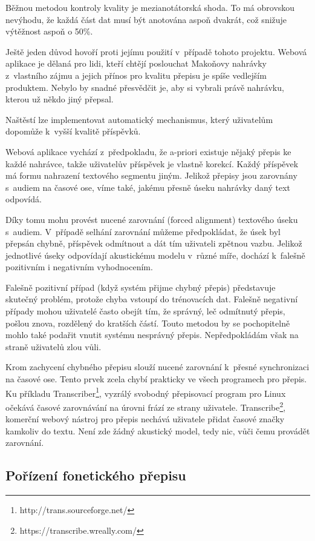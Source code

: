 Běžnou metodou kontroly kvality je mezianotátorská shoda. To má obrovskou
nevýhodu, že každá část dat musí být anotována aspoň dvakrát, což snižuje
výtěžnost aspoň o 50\%.

Ještě jeden důvod hovoří proti jejímu použití v~případě tohoto projektu. Webová
aplikace je dělaná pro lidi, kteří chtějí poslouchat Makoňovy nahrávky
z~vlastního zájmu a jejich přínos pro kvalitu přepisu je spíše vedlejším
produktem. Nebylo by snadné přesvědčit je, aby si vybrali právě nahrávku, kterou
už někdo jiný přepsal.

Naštěstí lze implementovat automatický mechanismus, který uživatelům dopomůže
k~vyšší kvalitě příspěvků.

Webová aplikace vychází z~předpokladu, že a-priori existuje nějaký přepis ke
každé nahrávce, takže uživatelův příspěvek je vlastně korekcí. Každý příspěvek
má formu nahrazení textového segmentu jiným. Jelikož přepisy jsou zarovnány
s~audiem na časové ose, víme také, jakému přesně úseku nahrávky daný text
odpovídá.

Díky tomu mohu provést nucené zarovnání (forced alignment) textového úseku
s~audiem. V~případě selhání zarovnání můžeme předpokládat, že úsek byl přepsán
chybně, příspěvek odmítnout a dát tím uživateli zpětnou vazbu. Jelikož
jednotlivé úseky odpovídají akustickému modelu v~různé míře, dochází k~falešně
pozitivním i negativním vyhodnocením.

Falešně pozitivní případ (když systém přijme chybný přepis) představuje skutečný
problém, protože chyba vstoupí do trénovacích dat. Falešně negativní případy
mohou uživatelé často obejít tím, že správný, leč odmítnutý přepis, pošlou
znova, rozdělený do kratších částí. Touto metodou by se pochopitelně mohlo také
podařit vnutit systému nesprávný přepis. Nepředpokládám však na straně uživatelů
zlou vůli.

Krom zachycení chybného přepisu slouží nucené zarovnání k~přesné synchronizaci
na časové ose. Tento prvek zcela chybí prakticky ve všech programech pro přepis.
Ku příkladu Transcriber\footnote{http://trans.sourceforge.net/}, vyzrálý
svobodný přepisovací program pro Linux očekává časové zarovnávání na úrovni
frází ze strany uživatele. Transcribe\footnote{https://transcribe.wreally.com/},
komerční webový nástroj pro přepis nechává uživatele přidat časové značky
kamkoliv do textu. Není zde žádný akustický model, tedy nic, vůči čemu provádět
zarovnání.

\subsection{Pořízení fonetického přepisu}
\label{ssec:porizeni-fonetickeho-prepisu}

